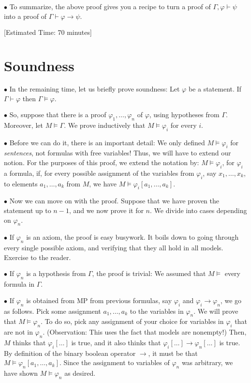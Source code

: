 \documentclass{article}
\newcommand\point[1]{\noindent \hspace{\labelsep} $\bullet$ #1 \smallskip}
\newcommand\timestamp[1]{\noindent \hspace{\labelsep} [Estimated Time: #1] \smallskip}
\begin{document}
\point{To summarize, the above proof gives you a recipe to turn a proof of $\Gamma, \varphi \vdash \psi$ into a proof of $\Gamma \vdash \varphi \rightarrow \psi$.}

\timestamp{70 minutes}

\section{Soundness}

\point{In the remaining time, let us briefly prove soundness: Let $\varphi$ be a statement. If $\Gamma \vdash \varphi$ then $\Gamma \vDash \varphi$.}

\point{So, suppose that there is a proof $\varphi_1, \dots, \varphi_n$ of $\varphi$, using hypotheses from $\Gamma$. Moreover, let $M \vDash \Gamma$. We prove inductively that $M \vDash \varphi_i$ for every $i$.}

\point{Before we can do it, there is an important detail: We only defined $M \vDash \varphi_i$ for \emph{sentences}, not formulas with free variables! Thus, we will have to extend our notion. For the purposes of this proof, we extend the notation by: $M \vDash \varphi_i$, for $\varphi_i$ a formula, if, for every possible assignment of the variables from $\varphi_i$, say $x_1, \dots, x_k$, to elements $a_1, \dots, a_k$ from $M$, we have $M \vDash \varphi_i[a_1, \dots, a_k]$.}

\point{Now we can move on with the proof. Suppose that we have proven the statement up to $n-1$, and we now prove it for $n$. We divide into cases depending on $\varphi_n$.}

\point{If $\varphi_n$ is an axiom, the proof is easy busywork. It boils down to going through every single possible axiom, and verifying that they all hold in all models. Exercise to the reader.}

\point{If $\varphi_n$ is a hypothesis from $\Gamma$, the proof is trivial: We assumed that $M \vDash$ every formula in $\Gamma$.}

\point{If $\varphi_n$ is obtained from MP from previous formulas, say $\varphi_i$ and $\varphi_i \rightarrow \varphi_n$, we go as follows. Pick some assignment $a_1, \dots, a_k$ to the variables in $\varphi_n$. We will prove that $M \vDash \varphi_n$. To do so, pick any assignment of your choice for variables in $\varphi_i$ that are not in $\varphi_n$. (Observation: This uses the fact that models are nonempty!) Then, $M$ thinks that $\varphi_i[\dots]$ is true, and it also thinks that $\varphi_i[\dots] \rightarrow \varphi_n[\dots]$ is true. By definition of the binary boolean operator $\rightarrow$, it must be that $M \vDash \varphi_n[a_1, \dots, a_k]$. Since the assignment to variables of $\varphi_n$ was arbitrary, we have shown $M \vDash \varphi_n$ as desired.}
\end{document}
